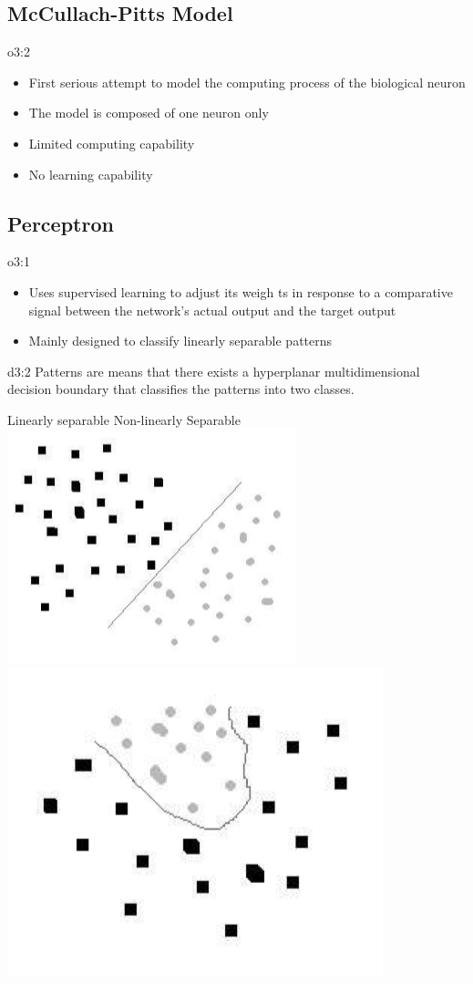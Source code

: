 \documentclass{tron}
\begin{document}
\subsection{McCullach-Pitts Model}
\begin{overview}{o3:2}
	\begin{itemize}
		\item First serious attempt to model the computing process of the biological neuron
		\item The model is composed of one neuron only
		\item Limited computing capability
		\item No learning capability
	\end{itemize}
\end{overview}


\newpage
\subsection{Perceptron}
\begin{overview}[Perceptron]{o3:1}
	\begin{itemize}
		\item Uses supervised learning to adjust its weigh ts in response to a comparative signal between the network's actual output and the target output
		\item Mainly designed to classify linearly separable patterns
	\end{itemize}
\end{overview}
\begin{definition}{d3:2}
	Patterns are  means that there exists a hyperplanar multidimensional decision boundary that classiﬁes the patterns into two classes.
	
	\qquad Linearly separable \qquad \qquad Non-linearly Separable\\
	\includegraphics[width=0.3\columnwidth]{Figs/Lec4/linearly_sep}
	\includegraphics[width=0.3\columnwidth]{Figs/Lec4/non_linearly_sep}
\end{definition}
\end{document}
